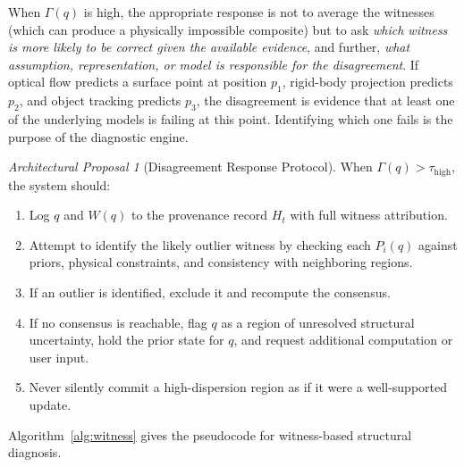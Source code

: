 \documentclass[11pt,a4paper]{article}
\theoremstyle{plain}
\theoremstyle{definition}
\theoremstyle{remark}
\newtheorem{proposal}[theorem]{Architectural Proposal}
\begin{document}
When $\Gamma(q)$ is high, the appropriate response is not to average the witnesses (which can produce a physically impossible composite) but to ask \textit{which witness is more likely to be correct given the available evidence}, and further, \textit{what assumption, representation, or model is responsible for the disagreement}. If optical flow predicts a surface point at position $p_1$, rigid-body projection predicts $p_2$, and object tracking predicts $p_3$, the disagreement is evidence that at least one of the underlying models is failing at this point. Identifying which one fails is the purpose of the diagnostic engine.

\begin{proposal}[Disagreement Response Protocol]
When $\Gamma(q) > \tau_{\text{high}}$, the system should:
\begin{enumerate}[leftmargin=2em,itemsep=0pt]
\item Log $q$ and $W(q)$ to the provenance record $H_t$ with full witness attribution.
\item Attempt to identify the likely outlier witness by checking each $P_i(q)$ against priors, physical constraints, and consistency with neighboring regions.
\item If an outlier is identified, exclude it and recompute the consensus.
\item If no consensus is reachable, flag $q$ as a region of unresolved structural uncertainty, hold the prior state for $q$, and request additional computation or user input.
\item Never silently commit a high-dispersion region as if it were a well-supported update.
\end{enumerate}
\end{proposal}

Algorithm~\ref{alg:witness} gives the pseudocode for witness-based structural diagnosis.
\end{document}
